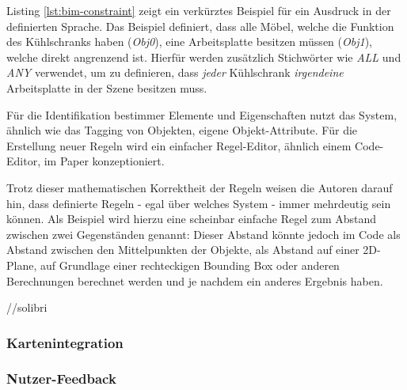 Listing \ref{lst:bim-constraint} zeigt ein verkürztes Beispiel für ein Ausdruck in der definierten Sprache. Das Beispiel definiert, dass alle Möbel, welche die Funktion des Kühlschranks haben (\textit{Obj0}), eine Arbeitsplatte besitzen müssen (\textit{Obj1}), welche direkt angrenzend ist. Hierfür werden zusätzlich Stichwörter wie \textit{ALL} und \textit{ANY} verwendet, um zu definieren, dass \textit{jeder} Kühlschrank \textit{irgendeine} Arbeitsplatte in der Szene besitzen muss.

Für die Identifikation bestimmer Elemente und Eigenschaften nutzt das System, ähnlich wie das Tagging von Objekten, eigene Objekt-Attribute. Für die Erstellung neuer Regeln wird ein einfacher Regel-Editor, ähnlich einem Code-Editor, im Paper konzeptioniert. 

Trotz dieser mathematischen Korrektheit der Regeln weisen die Autoren darauf hin, dass definierte Regeln - egal über welches System - immer mehrdeutig sein können. Als Beispiel wird hierzu eine scheinbar einfache Regel zum Abstand zwischen zwei Gegenständen genannt: Dieser Abstand könnte jedoch im Code als Abstand zwischen den Mittelpunkten der Objekte, als Abstand auf einer 2D-Plane, auf Grundlage einer rechteckigen Bounding Box oder anderen Berechnungen berechnet werden und je nachdem ein anderes Ergebnis haben.

\medskip

\textcite{schwabeBIMApplicationsRuleBased2016a}

\medskip

//solibri


\subsubsection{Kartenintegration}

\subsubsection{Nutzer-Feedback}